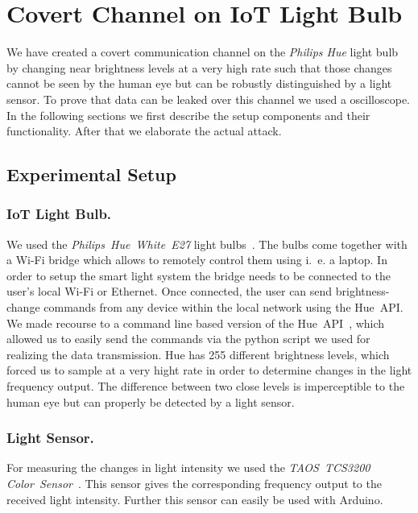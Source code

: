 \section{Covert Channel on IoT Light Bulb}
\label{sec:experiment}

We have created a covert communication channel on the \textit{Philips Hue} light bulb by changing near brightness levels at a very high rate such that those changes cannot be seen by the human eye but can be robustly distinguished by a light sensor. To prove that data can be leaked over this channel we used a oscilloscope. In the following sections we first describe the setup components and their functionality. After that we elaborate the actual attack.\newline

\subsection{Experimental Setup}
\label{sec:setup}


\subsubsection{IoT Light Bulb.} We used the \textit{Philips~Hue~White~E27} light bulbs~\cite{TODO:bibid}. The bulbs come together with a Wi-Fi bridge which allows to remotely control them using i.~e. a laptop. In order to setup the smart light system the bridge needs to be connected to the user's local Wi-Fi or Ethernet. Once connected, the user can send brightness-change commands from any device within the local network using the Hue~API. We made recourse to a command line based version of the Hue~API~\cite{TODO:bibid}, which allowed us to easily send the commands via the python script we used for realizing the data transmission.
Hue has 255 different brightness levels, which forced us to sample at a very hight rate in order to determine changes in the light frequency output. The difference between two close levels is imperceptible to the human eye but can properly be detected by a light sensor.

\subsubsection{Light Sensor.} For measuring the changes in light intensity we used the \textit{TAOS~TCS3200 Color~Sensor}~\cite{TODO:bibid}. This sensor gives the corresponding frequency output to the received light intensity. Further this sensor can easily be used with Arduino.  
 

